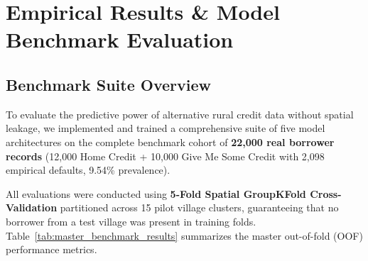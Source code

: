 \chapter{Empirical Results \& Model Benchmark Evaluation}
\label{chap:results}

\section{Benchmark Suite Overview}
To evaluate the predictive power of alternative rural credit data without spatial leakage, we implemented and trained a comprehensive suite of five model architectures on the complete benchmark cohort of \textbf{22,000 real borrower records} (12,000 Home Credit + 10,000 Give Me Some Credit with 2,098 empirical defaults, 9.54\% prevalence). 

All evaluations were conducted using \textbf{5-Fold Spatial GroupKFold Cross-Validation} partitioned across 15 pilot village clusters, guaranteeing that no borrower from a test village was present in training folds. Table~\ref{tab:master_benchmark_results} summarizes the master out-of-fold (OOF) performance metrics.

